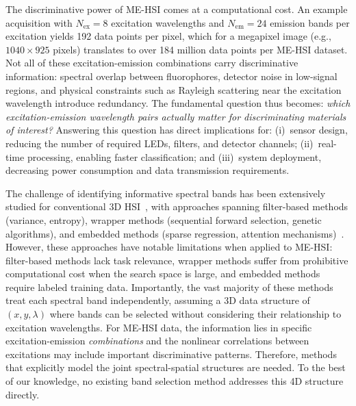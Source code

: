 The discriminative power of ME-HSI comes at a computational cost.
An example acquisition with $N_{\text{ex}} = 8$ excitation wavelengths and $N_{\text{em}} = 24$ emission bands per excitation yields 192 data points per pixel, which for a megapixel image (e.g., $1040 \times 925$ pixels) translates to over 184 million data points per ME-HSI dataset.
Not all of these excitation-emission combinations carry discriminative information: spectral overlap between fluorophores, detector noise in low-signal regions, and physical constraints such as Rayleigh scattering near the excitation wavelength introduce redundancy.
The fundamental question thus becomes: \emph{which excitation-emission wavelength pairs actually matter for discriminating materials of interest?}
Answering this question has direct implications for:
(i)~sensor design, reducing the number of required LEDs, filters, and detector channels;
(ii)~real-time processing, enabling faster classification; and
(iii)~system deployment, decreasing power consumption and data transmission requirements.

The challenge of identifying informative spectral bands has been extensively studied for conventional 3D HSI~\cite{sun2019hyperspectral,sawant2021survey,rasti2020featureextraction,ahmad2022survey,jia2020survey,asfour2018,guan2018}, with approaches spanning filter-based methods (variance, entropy), wrapper methods (sequential forward selection, genetic algorithms), and embedded methods (sparse regression, attention mechanisms)~\cite{martinez2006comparison,chang2000constrained,pudil1994floating,pal2010feature,tibshirani1996regression,lorenzo2020attention}.
However, these approaches have notable limitations when applied to ME-HSI: filter-based methods lack task relevance, wrapper methods suffer from prohibitive computational cost when the search space is large, and embedded methods require labeled training data.
Importantly, the vast majority of these methods treat each spectral band independently, assuming a 3D data structure of $(x, y, \lambda)$ where bands can be selected without considering their relationship to excitation wavelengths.
For ME-HSI data, the information lies in specific excitation-emission \emph{combinations} and the nonlinear correlations between excitations may include important discriminative patterns.
Therefore, methods that explicitly model the joint spectral-spatial structures are needed.
To the best of our knowledge, no existing band selection method addresses this 4D structure directly.

